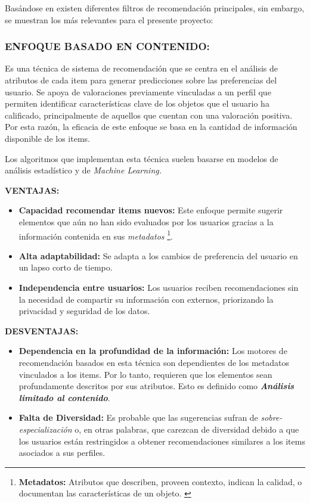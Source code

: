 Basándose en \parencite{ISINKAYE2015261} existen diferentes filtros de recomendación principales, sin embargo, se muestran los más relevantes para el presente proyecto:

\subsubsection{ENFOQUE BASADO EN CONTENIDO: }
Es una técnica de sistema de recomendación que se centra en el análisis de atributos de cada item para generar predicciones sobre las preferencias del usuario. Se apoya de valoraciones previamente vinculadas a un perfil que permiten identificar características clave de los objetos que el usuario ha calificado, principalmente de aquellos que cuentan con una valoración positiva.  Por esta razón, la eficacia de este enfoque se basa en la cantidad de información disponible de los items.

Los algoritmos que implementan esta técnica suelen basarse en modelos de análisis estadístico y de \textit{Machine Learning.}

\textbf{VENTAJAS: }
\begin{itemize}

    \item \textbf{Capacidad recomendar items nuevos: } Este enfoque permite sugerir elementos que aún no han sido evaluados por los usuarios gracias a la información contenida en sus \textit{metadatos} \footnote{\textbf{Metadatos: } Atributos que describen, proveen contexto, indican la calidad, o documentan las características de un objeto. \parencite{Greenberg09092005}}.
    \item \textbf{Alta adaptabilidad: } Se adapta a los cambios de preferencia del usuario en un lapso corto de tiempo.

    \item \textbf{Independencia entre usuarios: } Los usuarios reciben recomendaciones sin la necesidad de compartir su información con externos, priorizando la privacidad y seguridad de los datos.
    
\end{itemize}

\newpage
\thispagestyle{plain}
\vspace*{0.2cm}

\textbf{DESVENTAJAS: }
\begin{itemize}

    \item \textbf{Dependencia en la profundidad de la información: } Los motores de recomendación basados en esta técnica son dependientes de los metadatos vinculados a los items. Por lo tanto, requieren que los elementos sean profundamente descritos por sus atributos. Esto es definido como \textbf{\textit{Análisis limitado al contenido}}.
    
    \item \textbf{Falta de Diversidad: } Es probable que las sugerencias sufran de \textit{sobre-especialización} o, en otras palabras, que carezcan de diversidad debido a que los usuarios están restringidos a obtener recomendaciones similares a los items asociados a sus perfiles.
\end{itemize}

